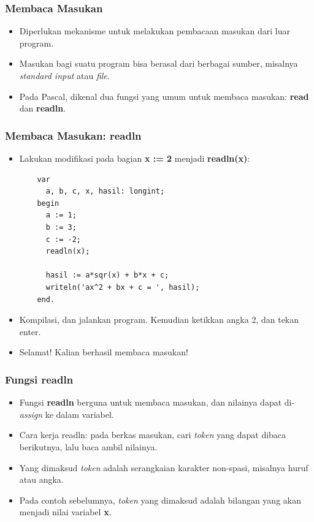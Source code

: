 \begin{frame}
\frametitle{Membaca Masukan}
\begin{itemize}
  \item Diperlukan mekanisme untuk melakukan pembacaan masukan dari luar program.
  \item Masukan bagi suatu program bisa berasal dari berbagai sumber, misalnya \textit{standard input} atau \textit{file}.
  \item Pada Pascal, dikenal dua fungsi yang umum untuk membaca masukan: \alert{\textbf{read}} dan \alert{\textbf{readln}}.
\end{itemize}
\end{frame}

\begin{frame}[fragile]
\frametitle{Membaca Masukan: readln}
\begin{itemize}
  \item Lakukan modifikasi pada bagian \textbf{x := 2} menjadi \textbf{readln(x)}:
  \begin{lstlisting}
    var
      a, b, c, x, hasil: longint;
    begin
      a := 1;
      b := 3;
      c := -2;
      readln(x);

      hasil := a*sqr(x) + b*x + c;
      writeln('ax^2 + bx + c = ', hasil);
    end.
  \end{lstlisting}
  \item Kompilasi, dan jalankan program. Kemudian ketikkan angka 2, dan tekan enter.
  \item Selamat! Kalian berhasil membaca masukan!
\end{itemize}
\end{frame}

\begin{frame}[fragile]
\frametitle{Fungsi readln}
  \begin{itemize}
    \item Fungsi \textbf{readln} berguna untuk membaca masukan, dan nilainya dapat di-\textit{assign} ke dalam variabel.
    \item Cara kerja readln: pada berkas masukan, cari \textit{token} yang dapat dibaca berikutnya, lalu baca ambil nilainya.
    \item Yang dimaksud \textit{token} adalah serangkaian karakter non-spasi, misalnya huruf atau angka.
    \item Pada contoh sebelumnya, \textit{token} yang dimaksud adalah bilangan yang akan menjadi nilai variabel \textbf{x}.
  \end{itemize}
\end{frame}


